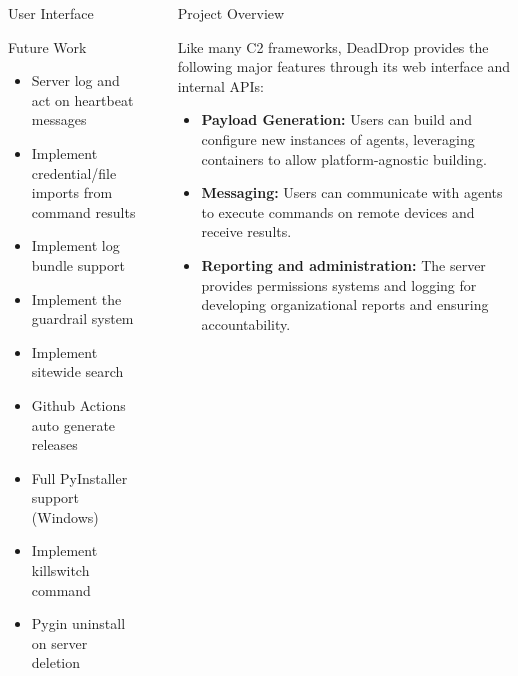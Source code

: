 \documentclass[final]{beamer}
\newlength{\sepwidth}
\newlength{\colwidth}
\newcommand{\separatorcolumn}{\begin{column}{\sepwidth}\end{column}}
\begin{document}
\begin{frame}[t]
\begin{columns}[t]
\begin{column}{\colwidth}
\begin{block}{User Interface}
  \end{block}

  \begin{block}{Future Work}

      \begin{itemize}
        \item Server log and act on heartbeat messages
        \item Implement credential/file imports from command results
        \item Implement log bundle support
        \item Implement the guardrail system
        \item Implement sitewide search
      \end{itemize}
      \begin{itemize}
        \item Github Actions auto generate releases
        \item Full PyInstaller support (Windows)
        \item Implement killswitch command
        \item Pygin uninstall on server deletion
      \end{itemize}
  \end{block}


\end{column}

\separatorcolumn

\begin{column}{\colwidth}

  \begin{block}{Project Overview}

    Like many C2 frameworks, DeadDrop provides the following major features through its web interface and internal APIs:

    \begin{itemize}
      \item \textbf{Payload Generation:}
        Users can build and configure new instances of agents, leveraging containers to allow platform-agnostic building.
      \item \textbf{Messaging:}
        Users can communicate with agents to execute commands on remote devices and receive results.
      \item \textbf{Reporting and administration:}
        The server provides permissions systems and logging for developing organizational reports and ensuring accountability.
    \end{itemize}


\end{block}
\end{column}
\end{columns}
\end{frame}
\end{document}
